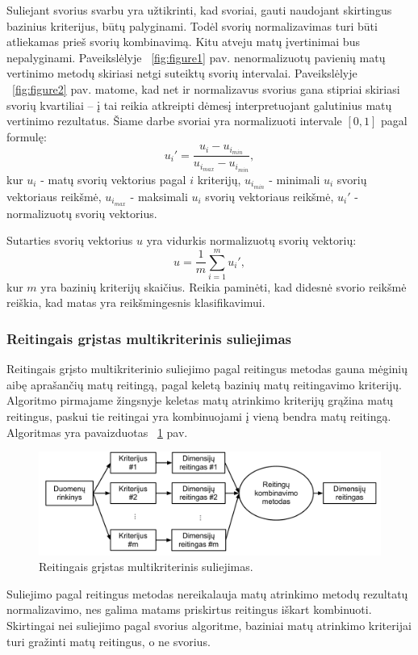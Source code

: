 Suliejant svorius svarbu yra užtikrinti, kad svoriai, gauti naudojant
skirtingus bazinius kriterijus, būtų palyginami. Todėl svorių normalizavimas
turi būti atliekamas prieš svorių kombinavimą. Kitu
atveju matų įvertinimai bus nepalyginami. Paveikslėlyje ~\ref{fig:figure1} pav.
nenormalizuotų pavienių matų vertinimo metodų skiriasi netgi suteiktų
svorių intervalai. Paveikslėlyje ~\ref{fig:figure2} pav. matome,
kad net ir normalizavus svorius gana stipriai skiriasi svorių kvartiliai -- į
tai reikia atkreipti dėmesį interpretuojant galutinius matų vertinimo 
rezultatus. Šiame darbe svoriai yra normalizuoti intervale $[0, 1]$ pagal formulę:
\begin{equation}
 u_i'=\frac{u_i - u_{i_{min}}}{u_{i_{max}} - u_{i_{min}}}, 
\end{equation}
kur $u_i$ - matų svorių vektorius pagal $i$ kriterijų, 
$u_{i_{min}}$ - minimali $u_i$ svorių vektoriaus reikšmė,
$u_{i_{max}}$ - maksimali $u_i$ svorių vektoriaus reikšmė,
$u_i'$ - normalizuotų svorių vektorius.

Sutarties svorių vektorius $u$ yra vidurkis normalizuotų svorių vektorių:
\begin{equation}
 u = \frac{1}{m}\sum_{i=1}^m u_i',
\end{equation}
kur $m$ yra bazinių kriterijų skaičius. Reikia paminėti, kad didesnė svorio reikšmė reiškia, kad matas yra reikšmingesnis klasifikavimui.

\subsubsection{Reitingais grįstas multikriterinis suliejimas}

Reitingais grįsto multikriterinio suliejimo pagal reitingus metodas gauna
mėginių aibę aprašančių matų reitingą, pagal keletą bazinių matų reitingavimo kriterijų. Algoritmo pirmajame žingsnyje
keletas matų atrinkimo kriterijų grąžina matų reitingus, paskui tie reitingai yra kombinuojami į vieną bendra matų reitingą. Algoritmas yra
pavaizduotas ~\ref{fig:figure5} pav.
\begin{figure}
 \centering
 \includegraphics[width=1\textwidth]{../bachelor/images/ranking_based_fusion.pdf}
 \caption{Reitingais grįstas multikriterinis suliejimas.}
 \label{fig:figure5}
\end{figure}
Suliejimo pagal reitingus metodas nereikalauja matų atrinkimo metodų rezultatų normalizavimo, nes galima matams priskirtus reitingus iškart kombinuoti. Skirtingai nei suliejimo pagal svorius algoritme, baziniai matų atrinkimo kriterijai turi gražinti matų reitingus, o ne svorius.

